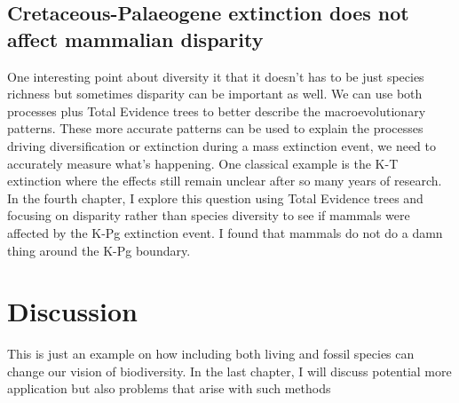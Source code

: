 \subsection{Cretaceous-Palaeogene extinction does not affect mammalian disparity}
One interesting point about diversity it that it doesn't has to be just species richness but sometimes disparity can be important as well.
We can use both processes plus Total Evidence trees to better describe the macroevolutionary patterns.
These more accurate patterns can be used to explain the processes driving diversification or extinction during a mass extinction event, we need to accurately measure what's happening.
One classical example is the K-T extinction where the effects still remain unclear after so many years of research.
In the fourth chapter, I explore this question using Total Evidence trees and focusing on disparity rather than species diversity to see if mammals were affected by the K-Pg extinction event.
I found that mammals do not do a damn thing around the K-Pg boundary.

\section{Discussion} %
This is just an example on how including both living and fossil species can change our vision of biodiversity.
In the last chapter, I will discuss potential more application but also problems that arise with such methods

